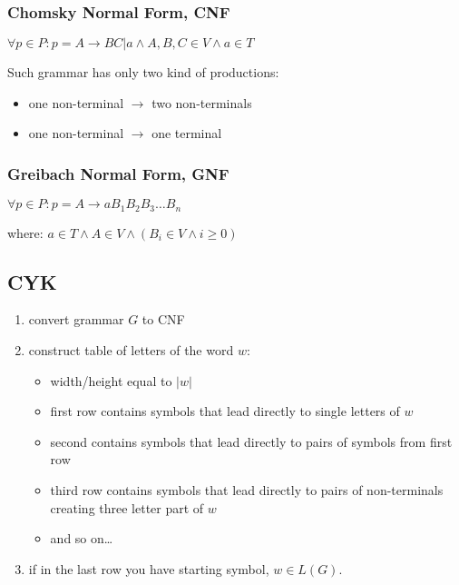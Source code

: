 \documentclass{article}
\begin{document}
\begin{multicols}{2}
\subsubsection{Chomsky Normal Form, CNF}
$\forall p \in P : p = A \rightarrow BC | a 
\wedge A,B,C \in V \wedge a \in T$

Such grammar has only two kind of productions:
\begin{itemize}[noitemsep,nolistsep]
  \item one non-terminal $\rightarrow$ two non-terminals
  \item one non-terminal $\rightarrow$ one terminal
\end{itemize}

\subsubsection{Greibach Normal Form, GNF}
$ \forall p \in P : p = A \rightarrow a B_1 B_2 B_3\ldots B_n $

where: $ a \in T \wedge A \in V \wedge 
\left( B_i \in V \wedge i \geq 0 \right) $

\end{multicols}

\subsection{CYK}

\begin{enumerate}
  \item convert grammar $G$ to CNF
  
  \item construct table of letters of the word $w$:
  \begin{itemize}[noitemsep,nolistsep]
    \item width/height equal to $|w|$
    
    \item first row contains symbols that lead directly to single letters of $w$
    
    \item second contains symbols that lead directly to pairs of symbols from first row
    
    \item third row contains symbols that lead directly to pairs of non-terminals creating three
    letter part of $w$
    
    \item and so on\ldots
    
  \end{itemize}
  
  \item if in the last row you have starting symbol, $w \in L(G)$.
  
\end{enumerate}
\end{document}
